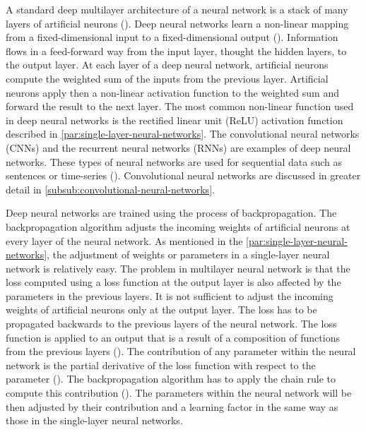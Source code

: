 \documentclass{BachelorBUI}
\begin{document}
                A standard deep multilayer architecture of a neural network is a stack of many layers of artificial neurons (\cite{LeCun:2015}). Deep neural networks learn a non-linear mapping from a fixed-dimensional input to a fixed-dimensional output (\cite{LeCun:2015}). Information flows in a feed-forward way from the input layer, thought the hidden layers, to the output layer. At each layer of a deep neural network, artificial neurons compute the weighted sum of the inputs from the previous layer. Artificial neurons apply then a non-linear activation function to the weighted sum and forward the result to the next layer. The most common non-linear function used in deep neural networks is the rectified linear unit (ReLU) activation function described in \autoref{par:single-layer-neural-networks}. The convolutional neural networks (CNNs) and the recurrent neural networks (RNNs) are examples of deep neural networks. These types of neural networks are used for sequential data such as sentences or time-series (\cite{Aggarwal:2018}). Convolutional neural networks are discussed in greater detail in \autoref{subsub:convolutional-neural-networks}.

                Deep neural networks are trained using the process of backpropagation. The backpropagation algorithm adjusts the incoming weights of artificial neurons at every layer of the neural network. As mentioned in the \autoref{par:single-layer-neural-networks}, the adjustment of weights or parameters in a single-layer neural network is relatively easy. The problem in multilayer neural network is that the loss computed using a loss function at the output layer is also affected by the parameters in the previous layers. It is not sufficient to adjust the incoming weights of artificial neurons only at the output layer. The loss has to be propagated backwards to the previous layers of the neural network. The loss function is applied to an output that is a result of a composition of functions from the previous layers (\cite{Bishop:2024}). The contribution of any parameter within the neural network is the partial derivative of the loss function with respect to the parameter (\cite{Bishop:2024}). The backpropagation algorithm has to apply the chain rule to compute this contribution (\cite{Aggarwal:2018}). The parameters within the neural network will be then adjusted by their contribution and a learning factor in the same way as those in the single-layer neural networks.
\end{document}
